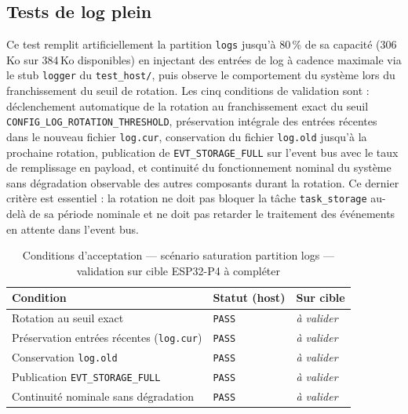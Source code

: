 \subsection{Tests de log plein}
\label{subsec:t_logfull}

Ce test remplit artificiellement la partition \texttt{logs} jusqu'à
80\,\% de sa capacité (306\,Ko sur 384\,Ko disponibles) en injectant
des entrées de log à cadence maximale via le stub \texttt{logger}
du \texttt{test\_host/}, puis observe le comportement du système lors
du franchissement du seuil de rotation. Les cinq conditions de
validation sont : déclenchement automatique de la rotation au franchissement
exact du seuil \texttt{CONFIG\_LOG\_ROTATION\_THRESHOLD}, préservation
intégrale des entrées récentes dans le nouveau fichier
\texttt{log.cur}, conservation du fichier \texttt{log.old} jusqu'à
la prochaine rotation, publication de \texttt{EVT\_STORAGE\_FULL}
sur l'event bus avec le taux de remplissage en payload, et continuité
du fonctionnement nominal du système sans dégradation observable
des autres composants durant la rotation. Ce dernier critère est
essentiel : la rotation ne doit pas bloquer la tâche
\texttt{task\_storage} au-delà de sa période nominale et ne doit
pas retarder le traitement des événements en attente dans l'event bus.

\begin{table}[H]
\centering
\renewcommand{\arraystretch}{1.5}
\caption{Conditions d'acceptation — scénario saturation partition logs — validation sur cible ESP32-P4 à compléter}
\label{tab:res_logfull}
\small
\begin{tabular}{|p{6.5cm}|p{2.0cm}|p{2.8cm}|}
\hline
\rowcolor{gray!20}
\textbf{Condition} & \textbf{Statut (host)} & \textbf{Sur cible} \\
\hline
Rotation au seuil exact                       & \texttt{PASS} & \textit{à valider} \\
\hline
Préservation entrées récentes (\texttt{log.cur}) & \texttt{PASS} & \textit{à valider} \\
\hline
Conservation \texttt{log.old}                 & \texttt{PASS} & \textit{à valider} \\
\hline
Publication \texttt{EVT\_STORAGE\_FULL}       & \texttt{PASS} & \textit{à valider} \\
\hline
Continuité nominale sans dégradation          & \texttt{PASS} & \textit{à valider} \\
\hline
\end{tabular}
\end{table}

